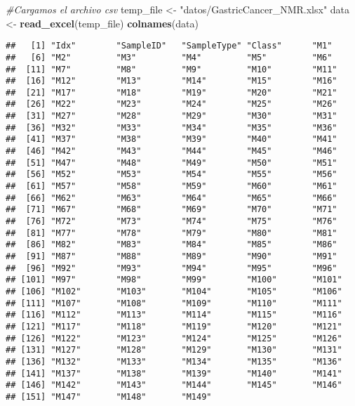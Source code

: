 \documentclass[
]{article}
\newenvironment{Shaded}{\begin{snugshade}}{\end{snugshade}}
\newcommand{\CommentTok}[1]{\textcolor[rgb]{0.56,0.35,0.01}{\textit{#1}}}
\newcommand{\FunctionTok}[1]{\textcolor[rgb]{0.13,0.29,0.53}{\textbf{#1}}}
\newcommand{\NormalTok}[1]{#1}
\newcommand{\OtherTok}[1]{\textcolor[rgb]{0.56,0.35,0.01}{#1}}
\newcommand{\StringTok}[1]{\textcolor[rgb]{0.31,0.60,0.02}{#1}}
\begin{document}
\begin{Shaded}
\begin{Highlighting}[]
\CommentTok{\#Cargamos el archivo csv}
\NormalTok{temp\_file }\OtherTok{\textless{}{-}} \StringTok{"datos/GastricCancer\_NMR.xlsx"}
\NormalTok{data }\OtherTok{\textless{}{-}} \FunctionTok{read\_excel}\NormalTok{(temp\_file)}
\FunctionTok{colnames}\NormalTok{(data)}
\end{Highlighting}
\end{Shaded}

\begin{verbatim}
##   [1] "Idx"        "SampleID"   "SampleType" "Class"      "M1"        
##   [6] "M2"         "M3"         "M4"         "M5"         "M6"        
##  [11] "M7"         "M8"         "M9"         "M10"        "M11"       
##  [16] "M12"        "M13"        "M14"        "M15"        "M16"       
##  [21] "M17"        "M18"        "M19"        "M20"        "M21"       
##  [26] "M22"        "M23"        "M24"        "M25"        "M26"       
##  [31] "M27"        "M28"        "M29"        "M30"        "M31"       
##  [36] "M32"        "M33"        "M34"        "M35"        "M36"       
##  [41] "M37"        "M38"        "M39"        "M40"        "M41"       
##  [46] "M42"        "M43"        "M44"        "M45"        "M46"       
##  [51] "M47"        "M48"        "M49"        "M50"        "M51"       
##  [56] "M52"        "M53"        "M54"        "M55"        "M56"       
##  [61] "M57"        "M58"        "M59"        "M60"        "M61"       
##  [66] "M62"        "M63"        "M64"        "M65"        "M66"       
##  [71] "M67"        "M68"        "M69"        "M70"        "M71"       
##  [76] "M72"        "M73"        "M74"        "M75"        "M76"       
##  [81] "M77"        "M78"        "M79"        "M80"        "M81"       
##  [86] "M82"        "M83"        "M84"        "M85"        "M86"       
##  [91] "M87"        "M88"        "M89"        "M90"        "M91"       
##  [96] "M92"        "M93"        "M94"        "M95"        "M96"       
## [101] "M97"        "M98"        "M99"        "M100"       "M101"      
## [106] "M102"       "M103"       "M104"       "M105"       "M106"      
## [111] "M107"       "M108"       "M109"       "M110"       "M111"      
## [116] "M112"       "M113"       "M114"       "M115"       "M116"      
## [121] "M117"       "M118"       "M119"       "M120"       "M121"      
## [126] "M122"       "M123"       "M124"       "M125"       "M126"      
## [131] "M127"       "M128"       "M129"       "M130"       "M131"      
## [136] "M132"       "M133"       "M134"       "M135"       "M136"      
## [141] "M137"       "M138"       "M139"       "M140"       "M141"      
## [146] "M142"       "M143"       "M144"       "M145"       "M146"      
## [151] "M147"       "M148"       "M149"
\end{verbatim}
\end{document}
